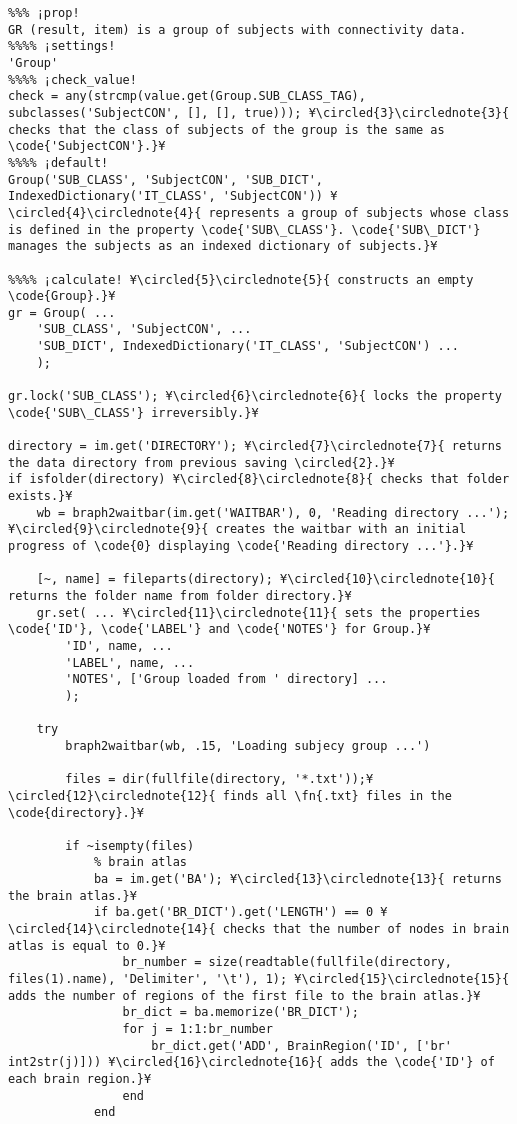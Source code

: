 \documentclass{tufte-handout}
\begin{document}
\begin{lstlisting}
%%% ¡prop!
GR (result, item) is a group of subjects with connectivity data.
%%%% ¡settings!
'Group'
%%%% ¡check_value!
check = any(strcmp(value.get(Group.SUB_CLASS_TAG), subclasses('SubjectCON', [], [], true))); ¥\circled{3}\circlednote{3}{ checks that the class of subjects of the group is the same as \code{'SubjectCON'}.}¥
%%%% ¡default!
Group('SUB_CLASS', 'SubjectCON', 'SUB_DICT', IndexedDictionary('IT_CLASS', 'SubjectCON')) ¥\circled{4}\circlednote{4}{ represents a group of subjects whose class is defined in the property \code{'SUB\_CLASS'}. \code{'SUB\_DICT'} manages the subjects as an indexed dictionary of subjects.}¥

%%%% ¡calculate! ¥\circled{5}\circlednote{5}{ constructs an empty \code{Group}.}¥
gr = Group( ...
    'SUB_CLASS', 'SubjectCON', ...
    'SUB_DICT', IndexedDictionary('IT_CLASS', 'SubjectCON') ...
    );

gr.lock('SUB_CLASS'); ¥\circled{6}\circlednote{6}{ locks the property \code{'SUB\_CLASS'} irreversibly.}¥

directory = im.get('DIRECTORY'); ¥\circled{7}\circlednote{7}{ returns the data directory from previous saving \circled{2}.}¥
if isfolder(directory) ¥\circled{8}\circlednote{8}{ checks that folder exists.}¥
    wb = braph2waitbar(im.get('WAITBAR'), 0, 'Reading directory ...'); ¥\circled{9}\circlednote{9}{ creates the waitbar with an initial progress of \code{0} displaying \code{'Reading directory ...'}.}¥
    
    [~, name] = fileparts(directory); ¥\circled{10}\circlednote{10}{ returns the folder name from folder directory.}¥
    gr.set( ... ¥\circled{11}\circlednote{11}{ sets the properties \code{'ID'}, \code{'LABEL'} and \code{'NOTES'} for Group.}¥
        'ID', name, ...
        'LABEL', name, ...
        'NOTES', ['Group loaded from ' directory] ...
        );

    try
        braph2waitbar(wb, .15, 'Loading subjecy group ...')

        files = dir(fullfile(directory, '*.txt'));¥\circled{12}\circlednote{12}{ finds all \fn{.txt} files in the \code{directory}.}¥

        if ~isempty(files) 
            % brain atlas
            ba = im.get('BA'); ¥\circled{13}\circlednote{13}{ returns the brain atlas.}¥
            if ba.get('BR_DICT').get('LENGTH') == 0 ¥\circled{14}\circlednote{14}{ checks that the number of nodes in brain atlas is equal to 0.}¥
                br_number = size(readtable(fullfile(directory, files(1).name), 'Delimiter', '\t'), 1); ¥\circled{15}\circlednote{15}{ adds the number of regions of the first file to the brain atlas.}¥
                br_dict = ba.memorize('BR_DICT');
                for j = 1:1:br_number
                    br_dict.get('ADD', BrainRegion('ID', ['br' int2str(j)])) ¥\circled{16}\circlednote{16}{ adds the \code{'ID'} of each brain region.}¥
                end
            end


\end{lstlisting}
\end{document}
